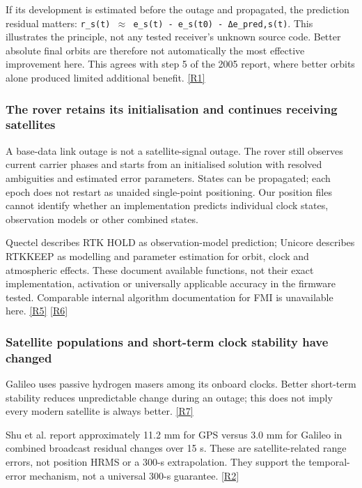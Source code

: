 \documentclass[11pt,a4paper]{article}
\numberwithin{equation}{section}
\numberwithin{figure}{section}
\begin{document}
If its development is estimated before the outage and propagated, the prediction residual matters: {\small\texttt{r\_\allowbreak{}s(t) \ensuremath{\approx} e\_\allowbreak{}s(t) - e\_\allowbreak{}s(t0) - Δe\_\allowbreak{}pred,s(t)}}. This illustrates the principle, not any tested receiver's unknown source code. Better absolute final orbits are therefore not automatically the most effective improvement here. This agrees with step 5 of the 2005 report, where better orbits alone produced limited additional benefit. \hyperlink{ref-R1}{[R1]}

\subsubsection{The rover retains its initialisation and continues receiving satellites}

A base-data link outage is not a satellite-signal outage. The rover still observes current carrier phases and starts from an initialised solution with resolved ambiguities and estimated error parameters. States can be propagated; each epoch does not restart as unaided single-point positioning. Our position files cannot identify whether an implementation predicts individual clock states, observation models or other combined states.

Quectel describes RTK HOLD as observation-model prediction; Unicore describes RTKKEEP as modelling and parameter estimation for orbit, clock and atmospheric effects. These document available functions, not their exact implementation, activation or universally applicable accuracy in the firmware tested. Comparable internal algorithm documentation for FMI is unavailable here. \hyperlink{ref-R5}{[R5]} \hyperlink{ref-R6}{[R6]}

\subsubsection{Satellite populations and short-term clock stability have changed}

Galileo uses passive hydrogen masers among its onboard clocks. Better short-term stability reduces unpredictable change during an outage; this does not imply every modern satellite is always better. \hyperlink{ref-R7}{[R7]}

Shu et al. report approximately 11.2 mm for GPS versus 3.0 mm for Galileo in combined broadcast residual changes over 15 s. These are satellite-related range errors, not position HRMS or a 300-s extrapolation. They support the temporal-error mechanism, not a universal 300-s guarantee. \hyperlink{ref-R2}{[R2]}
\end{document}
